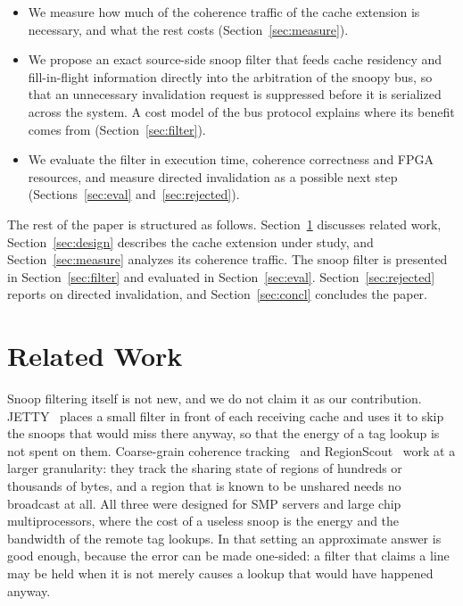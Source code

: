\documentclass[conference]{IEEEtran}
\begin{document}
\begin{itemize}
  \item We measure how much of the coherence traffic of the cache extension
        is necessary, and what the rest costs (Section~\ref{sec:measure}).
  \item We propose an exact source-side snoop filter that feeds cache
        residency and fill-in-flight information directly into the
        arbitration of the snoopy bus, so that an unnecessary invalidation
        request is suppressed before it is serialized across the system. A
        cost model of the bus protocol explains where its benefit comes from
        (Section~\ref{sec:filter}).
  \item We evaluate the filter in execution time, coherence correctness and
        FPGA resources, and measure directed invalidation as a possible next
        step (Sections~\ref{sec:eval} and~\ref{sec:rejected}).
\end{itemize}

The rest of the paper is structured as follows.
Section~\ref{sec:related} discusses related work, Section~\ref{sec:design}
describes the cache extension under study, and Section~\ref{sec:measure}
analyzes its coherence traffic. The snoop filter is presented in
Section~\ref{sec:filter} and evaluated in Section~\ref{sec:eval}.
Section~\ref{sec:rejected} reports on directed invalidation, and
Section~\ref{sec:concl} concludes the paper.

\section{Related Work}
\label{sec:related}

Snoop filtering itself is not new, and we do not claim it as our
contribution. JETTY~\cite{jetty} places a small filter in front of each
receiving cache and uses it to skip the snoops that would miss there anyway,
so that the energy of a tag lookup is not spent on them. Coarse-grain
coherence tracking~\cite{cgct} and RegionScout~\cite{regionscout} work at a
larger granularity: they track the sharing state of regions of hundreds or
thousands of bytes, and a region that is known to be unshared needs no
broadcast at all. All three were designed for SMP servers and large chip
multiprocessors, where the cost of a useless snoop is the energy and the
bandwidth of the remote tag lookups. In that setting an approximate answer is
good enough, because the error can be made one-sided: a filter that claims a
line may be held when it is not merely causes a lookup that would have
happened anyway.
\end{document}
